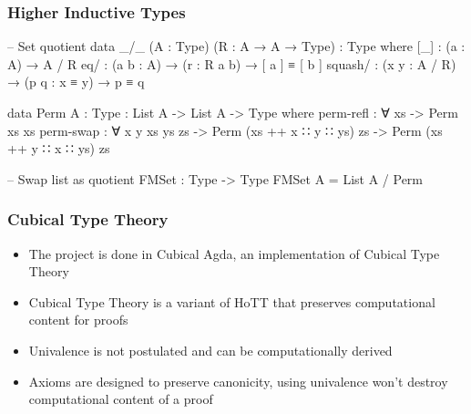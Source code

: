 \documentclass[9pt]{beamer}
\begin{document}
\begin{frame}[fragile]
\frametitle{Higher Inductive Types}

\begin{code}
-- Set quotient
data _/_ (A : Type) (R : A → A → Type) : Type where
  [_] : (a : A) → A / R
  eq/ : (a b : A) → (r : R a b) → [ a ] ≡ [ b ]
  squash/ : (x y : A / R) → (p q : x ≡ y) → p ≡ q

data Perm {A : Type} : List A -> List A -> Type where
  perm-refl : ∀ {xs} -> Perm xs xs
  perm-swap : ∀ {x y xs ys zs}
    -> Perm (xs ++ x ∷ y ∷ ys) zs
    -> Perm (xs ++ y ∷ x ∷ ys) zs

-- Swap list as quotient
FMSet : Type -> Type
FMSet A = List A / Perm
\end{code}

\end{frame}

\begin{frame}
\frametitle{Cubical Type Theory}

\begin{itemize}

  \item The project is done in Cubical Agda, an implementation of Cubical Type Theory
  \item Cubical Type Theory is a variant of HoTT that preserves computational content for proofs
  \item Univalence is not postulated and can be computationally derived
  \item Axioms are designed to preserve canonicity, using univalence won't destroy computational content of a proof

\end{itemize}


\end{frame}
\end{document}
